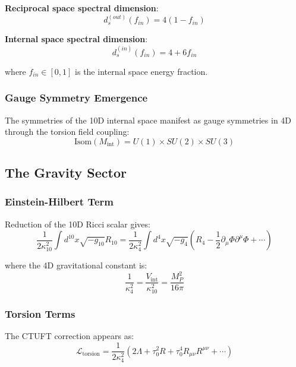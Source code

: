 \textbf{Reciprocal space spectral dimension}:
\begin{equation}
    d_s^{(out)}(f_{in}) = 4(1 - f_{in})
\end{equation}

\textbf{Internal space spectral dimension}:
\begin{equation}
    d_s^{(in)}(f_{in}) = 4 + 6f_{in}
\end{equation}

where $f_{in} \in [0,1]$ is the internal space energy fraction.

\subsubsection{Gauge Symmetry Emergence}

The symmetries of the 10D internal space manifest as gauge symmetries in 4D through the torsion field coupling:
\begin{equation}
    \text{Isom}(M_{\text{int}}) = U(1) \times SU(2) \times SU(3)
\end{equation}

\subsection{The Gravity Sector}

\subsubsection{Einstein-Hilbert Term}

Reduction of the 10D Ricci scalar gives:
\begin{equation}
    \frac{1}{2\kappa_{10}^2}\int d^{10}x \sqrt{-g_{10}}R_{10} = \frac{1}{2\kappa_4^2}\int d^4x \sqrt{-g_4}\left(R_4 - \frac{1}{2}\partial_\mu\Phi\partial^\mu\Phi + \cdots\right)
\end{equation}

where the 4D gravitational constant is:
\begin{equation}
    \frac{1}{\kappa_4^2} = \frac{V_{\text{int}}}{\kappa_{10}^2} = \frac{M_P^2}{16\pi}
\end{equation}

\subsubsection{Torsion Terms}

The CTUFT correction appears as:
\begin{equation}
    \mathcal{L}_{\text{torsion}} = \frac{1}{2\kappa_4^2}\left(2\Lambda + \tau_0^2 R + \tau_0^4 R_{\mu\nu}R^{\mu\nu} + \cdots\right)
\end{equation}


